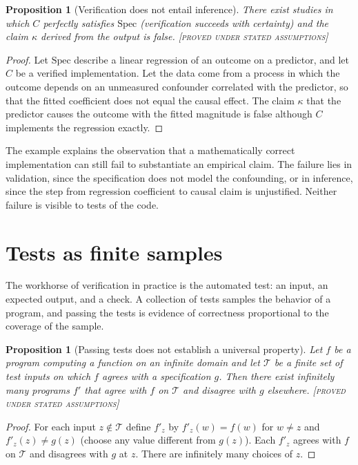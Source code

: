 \documentclass[11pt,twoside,openright]{book}
\theoremstyle{plain}
\newtheorem{proposition}[theorem]{Proposition}
\theoremstyle{definition}
\theoremstyle{remark}
\newcommand{\Proved}{\textup{\textsc{[proved under stated assumptions]}}}
\begin{document}
\begin{proposition}[Verification does not entail inference]\label{prop:verinf}
There exist studies in which $C$ perfectly satisfies $\mathrm{Spec}$ (verification succeeds with certainty) and the claim $\kappa$ derived from the output is false.
\Proved{}
\end{proposition}

\begin{proof}
Let $\mathrm{Spec}$ describe a linear regression of an outcome on a predictor, and let $C$ be a verified implementation. Let the data come from a process in which the outcome depends on an unmeasured confounder correlated with the predictor, so that the fitted coefficient does not equal the causal effect. The claim $\kappa$ that the predictor causes the outcome with the fitted magnitude is false although $C$ implements the regression exactly.
\end{proof}

The example explains the observation that a mathematically correct implementation can still fail to substantiate an empirical claim. The failure lies in validation, since the specification does not model the confounding, or in inference, since the step from regression coefficient to causal claim is unjustified. Neither failure is visible to tests of the code.

\section{Tests as finite samples}

The workhorse of verification in practice is the automated test: an input, an expected output, and a check. A collection of tests samples the behavior of a program, and passing the tests is evidence of correctness proportional to the coverage of the sample.

\begin{proposition}[Passing tests does not establish a universal property]\label{prop:tests}
Let $f$ be a program computing a function on an infinite domain and let $\mathcal{T}$ be a finite set of test inputs on which $f$ agrees with a specification $g$. Then there exist infinitely many programs $f'$ that agree with $f$ on $\mathcal{T}$ and disagree with $g$ elsewhere.
\Proved{}
\end{proposition}

\begin{proof}
For each input $z\notin\mathcal{T}$ define $f'_z$ by $f'_z(w)=f(w)$ for $w\ne z$ and $f'_z(z)\ne g(z)$ (choose any value different from $g(z)$). Each $f'_z$ agrees with $f$ on $\mathcal{T}$ and disagrees with $g$ at $z$. There are infinitely many choices of $z$.
\end{proof}
\end{document}

